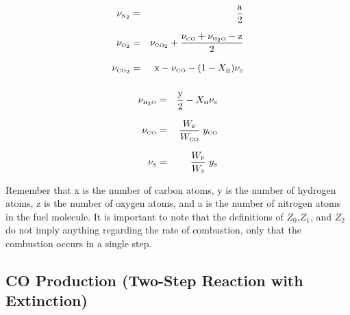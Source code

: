 \parbox{2.5in}{
\begin{eqnarray*}  \nu_{\tiny \hbox{N}_2}  &=& \frac{\hbox{a}}{2}\\*[.1in]
                  \nu_{\tiny \hbox{O}_2}  &=& \nu_{\tiny \hbox{CO}_2} + \frac{\nu_{\tiny \hbox{CO}}+\nu_{\tiny \hbox{H}_2\hbox{O}}-\hbox{z}}{2}\\*[.1in]
                  \nu_{\tiny \hbox{CO}_2} &=& \hbox{x} - \nu_{\tiny \hbox{CO}} - (1-X_{\tiny \hbox{H}}) \nu_{\tiny \hbox{S}}  \\*[.1in]
\end{eqnarray*} }
\hfill \parbox{3.5in}{\begin{eqnarray}
                  \nu_{\tiny \hbox{H}_2\hbox{O}} &=& \frac{\hbox{y}}{2}- X_{\tiny \hbox{H}} \nu_{\tiny \hbox{S}}\\*[.1in]
                  \nu_{\tiny \hbox{CO}}    &=& \frac{W_{\tiny \hbox{F}}}{W_{\tiny \hbox{CO}}} \; y_{\tiny \hbox{CO}} \\*[.1in]
                  \nu_{\tiny \hbox{S}}    &=& \frac{W_{\tiny \hbox{F}}}{W_{\tiny \hbox{S}}} \; y_{\tiny \hbox{S}}
\end{eqnarray} }
Remember that x is the number of carbon atoms, y is the number of hydrogen atoms, z is the number of oxygen atoms, and a is the number of nitrogen atoms in the fuel molecule.
It is important to note that the definitions of $Z_0$,$Z_1$, and $Z_2$ do not imply anything regarding the rate of combustion, only that the combustion occurs in a single step.


\subsection{CO Production (Two-Step Reaction with Extinction)}

\label{co_production}

